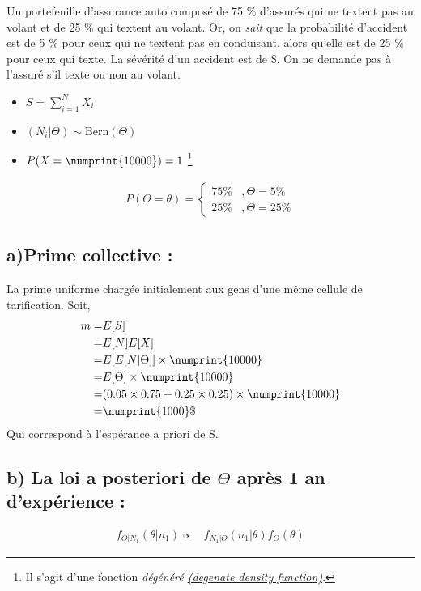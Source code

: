 \documentclass[11pt,french]{report}
\begin{document}
Un portefeuille d'assurance auto composé de 75 \% d'assurés qui ne textent pas au volant et de 25 \% qui textent au volant. Or, on \textit{sait} que la probabilité d'accident est de 5 \% pour ceux qui ne textent pas en conduisant, alors qu'elle est de 25 \% pour ceux qui texte. La sévérité d'un accident est de  \$. On ne demande pas à l'assuré s'il texte ou non au volant. 
\begin{itemize}
\item $S = \sum_{i = 1}^{N}X_i$
\item $(N_i|\Theta) \sim \text{Bern}(\Theta)$
\item $P(X = \numprint{10000}) = 1$ \footnote{Il s'agit d'une fonction \emph{dégénéré  \href{https://en.wikipedia.org/wiki/Degenerate_distribution}{(degenate density function)}}.}
\end{itemize}
\begin{align*}
	P(\Theta = \theta) =
     \left\{
     \begin{array}{rl}
      75\% &, \Theta = 5\% \\
      25\% &, \Theta = 25\%
     \end{array}
     \right.
\end{align*}

\subsection*{a)Prime collective :}
La prime uniforme chargée initialement aux gens d'une même cellule de tarification. Soit,
\begin{align*}
m =& E[S] \\
=& E[N] E[X] \\
=& E[E[N|\Theta]] \times  \numprint{10000} \\
=& E[\Theta] \times  \numprint{10000}\\
=& (0.05\times 0.75 + 0.25\times 0.25) \times  \numprint{10000}\\
=& \numprint{1000} \$
\end{align*}
Qui correspond à l'espérance a priori de S.

\subsection*{b) La loi a posteriori de $\Theta$ après 1 an d'expérience :}
\begin{align*}
f_{\Theta|N_1}(\theta|n_1) \propto & f_{N_1|\Theta}(n_1|\theta) f_{\Theta}(\theta)
\end{align*}
\end{document}
